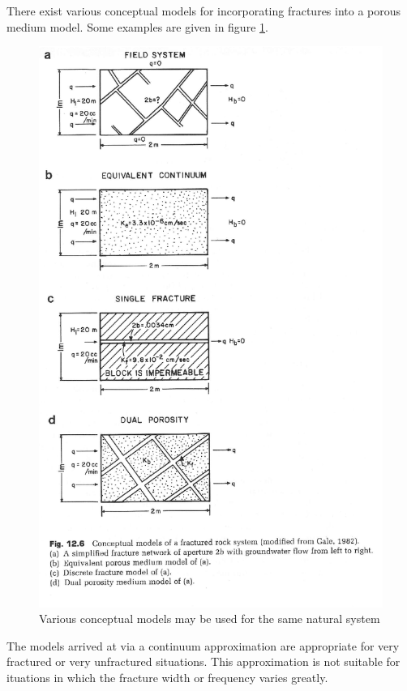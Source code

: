 {There exist various conceptual models for incorporating fractures into a porous  
medium model. Some examples are given in figure \ref{fig:fractureModels}.

\begin{figure}[htbp!]
  \begin{center}
    \includegraphics{./litrev/fractureModels.eps}
  \end{center}
  \caption{Various conceptual models may be used for the same natural system 
  \cite{anderson_applied_1992}}
  \label{fig:fractureModels}
\end{figure}


The models arrived at via a continuum approximation are appropriate
for very fractured or very unfractured situations. This approximation is not 
suitable for ituations in which the fracture width or frequency varies greatly.

}
